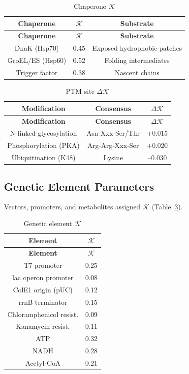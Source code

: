 \documentclass[12pt,a4paper]{article}
\newcommand{\REL}{\mathcal{K}}          %
\begin{document}
	\begin{longtable}{|c|c|c|}
		\caption{Chaperone \(\REL\)}\label{tab:chaperones}\\
		\hline
		\textbf{Chaperone} & \(\REL\) & \textbf{Substrate} \\
		\hline
		\endfirsthead
		\hline
		\textbf{Chaperone} & \(\REL\) & \textbf{Substrate} \\
		\hline
		\endhead
		\hline
		DnaK (Hsp70) & 0.45 & Exposed hydrophobic patches \\
		GroEL/ES (Hsp60) & 0.52 & Folding intermediates \\
		Trigger factor & 0.38 & Nascent chains \\
		\hline
	\end{longtable}
	
	\begin{longtable}{|c|c|c|}
		\caption{PTM site \(\Delta \REL\)}\label{tab:ptm}\\
		\hline
		\textbf{Modification} & \textbf{Consensus} & \(\Delta \REL\) \\
		\hline
		\endfirsthead
		\hline
		\textbf{Modification} & \textbf{Consensus} & \(\Delta \REL\) \\
		\hline
		\endhead
		\hline
		N‑linked glycosylation & Asn‑Xxx‑Ser/Thr & +0.015 \\
		Phosphorylation (PKA) & Arg‑Arg‑Xxx‑Ser & +0.020 \\
		Ubiquitination (K48) & Lysine & –0.030 \\
		\hline
	\end{longtable}
	
	\subsection{Genetic Element Parameters}
	Vectors, promoters, and metabolites assigned \(\REL\) (Table~\ref{tab:elements}).
	
	\begin{longtable}{|c|c|}
		\caption{Genetic element \(\REL\)}\label{tab:elements}\\
		\hline
		\textbf{Element} & \(\REL\) \\
		\hline
		\endfirsthead
		\hline
		\textbf{Element} & \(\REL\) \\
		\hline
		\endhead
		\hline
		T7 promoter & 0.25 \\
		lac operon promoter & 0.08 \\
		ColE1 origin (pUC) & 0.12 \\
		rrnB terminator & 0.15 \\
		Chloramphenicol resist. & 0.09 \\
		Kanamycin resist. & 0.11 \\
		ATP & 0.32 \\
		NADH & 0.28 \\
		Acetyl‑CoA & 0.21 \\
		\hline
	\end{longtable}
	
\end{document}

